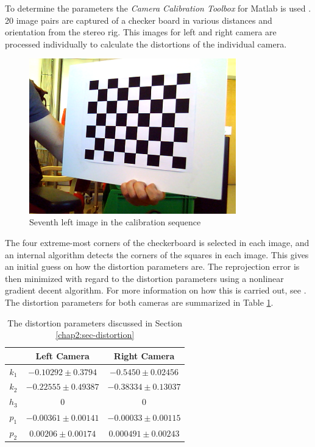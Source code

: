 To determine the parameters the \emph{Camera Calibration Toolbox} for Matlab is used
\cite{camera-calib-toolbox}. 20 image pairs are captured of a checker board in various
distances and orientation from the stereo rig. This images for left and right camera are
processed individually to calculate the distortions of the individual camera. 
\begin{figure}[htbp]
    \centering
    \includegraphics[width=0.8\textwidth]{pics/left7}
    \caption{Seventh left image in the calibration sequence}
    \label{chap2:fig-checkerboard}
\end{figure}
The four extreme-most corners of the checkerboard is selected in each image, and an
internal algorithm detects the corners of the squares in each image. This gives an initial
guess on how the distortion parameters are. The reprojection error is then minimized with
regard to the distortion parameters using a nonlinear gradient decent algorithm. For more
information on how this is carried out, see \cite{heikkila}.
The distortion parameters for both cameras are summarized in Table
\ref{chap3:tab-distortion-coeffs}.
\begin{table}[htbp]
  \centering
    \begin{tabular}{|c|c|c|} 
        \hline
                & Left Camera       & Right Camera \\
        \hline
        $k_1$   & $-0.10292 \pm 0.3794$            & $-0.5450 \pm 0.02456$  \\
        $k_2$   & $-0.22555 \pm 0.49387$            & $-0.38334 \pm 0.13037$  \\
        $h_3$   & $ 0$                          & $0$                  \\
        \hline
        $p_1$   & $-0.00361 \pm 0.00141$    & $-0.00033 \pm 0.00115$ \\
        $p_2$   & $0.00206 \pm 0.00174$     & $ 0.000491 \pm 0.00243$  \\
        \hline
    \end{tabular}
    \caption{The distortion parameters discussed in Section \ref{chap2:sec-distortion}}
    \label{chap3:tab-distortion-coeffs}
\end{table}

